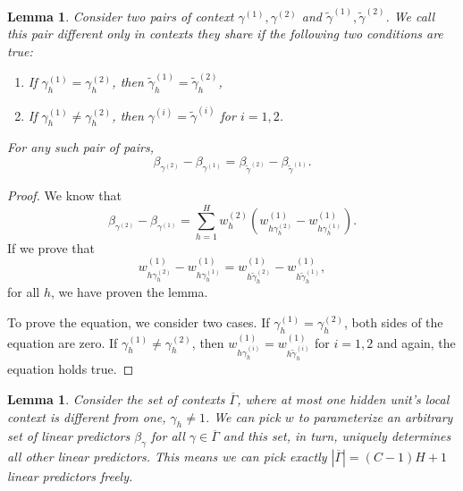\documentclass{article}
\theoremstyle{plain}
\newtheorem{lemma}[theorem]{Lemma}
\theoremstyle{definition}
\theoremstyle{remark}
\begin{document}
\begin{lemma}
\label{lem:arch-1}
Consider two pairs of context $\gamma^{(1)},\gamma^{(2)}$ and $\tilde{\gamma}^{(1)},\tilde{\gamma}^{(2)}$. We call this pair \emph{different only in contexts they share} if the following two conditions are true:

\begin{enumerate}
    \item If $\gamma^{(1)}_h=\gamma^{(2)}_h$, then $\tilde{\gamma}^{(1)}_h=\tilde{\gamma}^{(2)}_h$,
    \item If $\gamma^{(1)}_h\neq\gamma^{(2)}_h$, then $\gamma^{(i)}=\tilde{\gamma}^{(i)}$ for $i=1,2$.
\end{enumerate}

For any such pair of pairs,
\begin{equation}
\label{eq:arch-1}
    \beta_{\gamma^{(2)}}-\beta_{\gamma^{(1)}}=\beta_{\tilde{\gamma}^{(2)}}-\beta_{\tilde{\gamma}^{(1)}}.
\end{equation}
\end{lemma}

\begin{proof}
We know that
\begin{equation}
    \beta_{\gamma^{(2)}}-\beta_{\gamma^{(1)}}=
    \sum_{h=1}^Hw^{(2)}_h\left(w^{(1)}_{h\gamma^{(2)}_h}-w^{(1)}_{h\gamma^{(1)}_h}\right).
\end{equation}
If we prove that
\begin{equation}
    w^{(1)}_{h\gamma^{(2)}_h}-w^{(1)}_{h\gamma^{(1)}_h}=
    w^{(1)}_{h\tilde{\gamma}^{(2)}_h}-w^{(1)}_{h\tilde{\gamma}^{(1)}_h},
\end{equation}
for all $h$, we have proven the lemma.

To prove the equation, we consider two cases. If $\gamma^{(1)}_h=\gamma^{(2)}_h$, both sides of the equation are zero. If $\gamma^{(1)}_h\neq\gamma^{(2)}_h$, then $w^{(1)}_{h\gamma^{(i)}_h}=w^{(1)}_{h\tilde{\gamma}^{(i)}_h}$ for $i=1,2$ and again, the equation holds true.
\end{proof}

\begin{lemma}
\label{lem:arch-2}
Consider the set of contexts $\overline{\Gamma}$, where at most one hidden unit's local context is different from one, $\gamma_h\neq 1$.
We can pick $w$ to parameterize an arbitrary set of linear predictors $\beta_{\gamma}$ for all $\gamma\in\overline{\Gamma}$ and this set, in turn, uniquely determines all other linear predictors.
This means we can pick exactly $|\overline{\Gamma}|=(C-1)H+1$ linear predictors freely.
\end{lemma}
\end{document}

